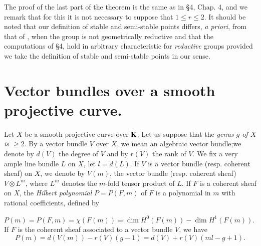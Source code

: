 The proof of the last part of the theorem is the same as in \S4, Chap. 4, \cite{art18-key5} and we remark that for this it is not necessary to suppose that $1\leq r\leq 2$. It should be noted that our definition of stable and semi-stable points differs, {\em a priori}, from that of \cite{art18-key4}, when the group is not geometrically reductive and that the computations of \S4, \cite{art18-key4} hold in arbitrary characteristic for {\em reductive} groups provided we take the definition of stable and semi-stable points in our sense.

\section{Vector bundles over a smooth projective curve.}\label{art18-sec3}

Let $X$ be a smooth projective curve over $\mathbf{K}$. Let us suppose that the {\em genus $g$ of $X$ is $\geq 2$}. By a vector bundle $V$ over $X$, we mean an algebraic vector bundle;\pageoriginale we denote by $d(V)$ the degree of $V$ and by $r(V)$ the rank of $V$. We fix a very ample line bundle $L$ on $X$, let $l=d(L)$. If $V$ is a vector bundle (resp. coherent sheaf) on $X$, we denote by $V(m)$, the vector bundle (resp. coherent sheaf) $V\otimes L^{m}$, where $L^{m}$ denotes the $m$-fold tensor product of $L$. If $F$ is a coherent sheaf on $X$, the {\em Hilbert polynomial} $P=P(F,m)$ of $F$ is a polynomial in $m$ with rational coefficients, defined by

$P(m)=P(F,m)=\chi(F(m))=\dim H^{0}(F(m))-\dim H^{1}(F(m))$. If $F$ is the coherent sheaf associated to a vector bundle $V$, we have
$$
P(m)=d(V(m))-r(V)(g-1)=d(V)+r(V)(ml-g+1).
$$

